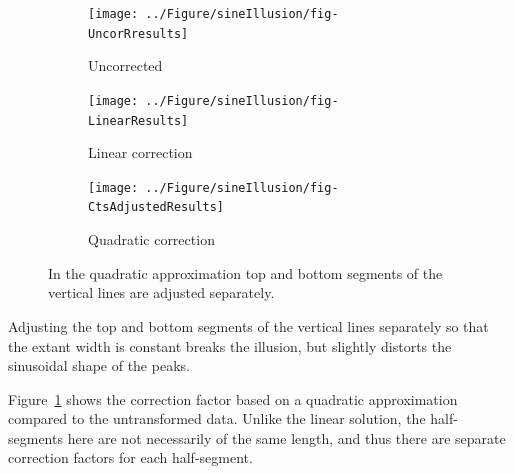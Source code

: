\documentclass[11pt]{isuthesis}\usepackage[]{graphicx}\usepackage[]{color}
\newenvironment{knitrout}{}{} %
\begin{document}
\begin{figure}
\begin{subfigure}[b]{.32\textwidth}\centering
\begin{knitrout}
\color{fgcolor}

{\centering \texttt{[image: ../Figure/sineIllusion/fig-UncorRresults]} 

}



\end{knitrout}
\caption{Uncorrected}
\end{subfigure}
\begin{subfigure}[b]{.32\textwidth}\centering
\begin{knitrout}
\color{fgcolor}

{\centering \texttt{[image: ../Figure/sineIllusion/fig-LinearResults]} 

}



\end{knitrout}
\caption{Linear correction}
\end{subfigure}
\begin{subfigure}[b]{.32\textwidth}\centering
\begin{knitrout}
\color{fgcolor}

{\centering \texttt{[image: ../Figure/sineIllusion/fig-CtsAdjustedResults]} 

}



\end{knitrout}
\caption{Quadratic correction}
\end{subfigure}
\caption[Quadratic Approximation]{
In the quadratic approximation top and bottom segments of the vertical lines are adjusted separately.}
\label{fig:GeneralQuadraticCorrection} 
\end{figure}

Adjusting the top and bottom segments of the vertical lines separately so that the extant width is constant breaks the illusion, but slightly distorts the sinusoidal shape of the peaks.

Figure~\ref{fig:GeneralQuadraticCorrection} shows the correction factor based on a quadratic approximation compared to the untransformed data. 
Unlike the linear solution, the half-segments here are not necessarily of the same length, and thus there are separate correction factors for each half-segment. 
\end{document}
